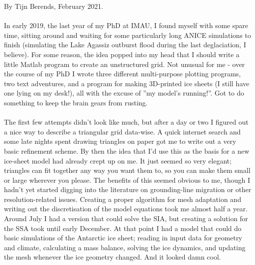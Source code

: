 \documentclass{article}
\begin{document}
By Tijn Berends, February 2021.\\
\\
In early 2019, the last year of my PhD at IMAU, I found myself with some spare time, sitting around and waiting for some particularly long ANICE simulations to finish (simulating the Lake Agassiz outburst flood during the last deglaciation, I believe). For some reason, the idea popped into my head that I should write a little Matlab program to create an unstructured grid. Not unusual for me - over the course of my PhD I wrote three different multi-purpose plotting programs, two text adventures, and a program for making 3D-printed ice sheets (I still have one lying on my desk!), all with the excuse of ''my model's running!''. Got to do something to keep the brain gears from rusting.\\
\\
The first few attempts didn't look like much, but after a day or two I figured out a nice way to describe a triangular grid data-wise. A quick internet search and some late nights spent drawing triangles on paper got me to write out a very basic refinement scheme. By then the idea that I'd use this as the basis for a new ice-sheet model had already crept up on me. It just seemed so very elegant; triangles can fit together any way you want them to, so you can make them small or large wherever you please. The benefits of this seemed obvious to me, though I hadn't yet started digging into the literature on grounding-line migration or other resolution-related issues. Creating a proper algorithm for mesh adaptation and writing out the discretisation of the model equations took me almost half a year. Around July I had a version that could solve the SIA, but creating a solution for the SSA took until early December. At that point I had a model that could do basic simulations of the Antarctic ice sheet; reading in input data for geometry and climate, calculating a mass balance, solving the ice dynamics, and updating the mesh whenever the ice geometry changed. And it looked damn cool.\\
\\
\end{document}
